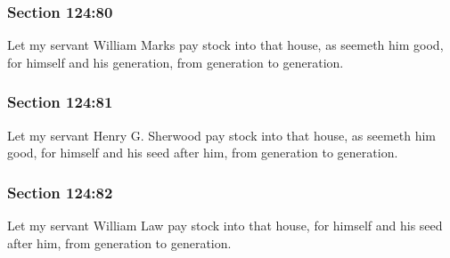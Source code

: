 	\subsubsection{Section 124:80} %
		\label{DC124-80}

		Let my servant William Marks pay stock into that house, as seemeth him good, for himself and his generation, from generation to generation.


	\subsubsection{Section 124:81} %
		\label{DC124-81}

		Let my servant Henry G. Sherwood pay stock into that house, as seemeth him good, for himself and his seed after him, from generation to generation.


	\subsubsection{Section 124:82} %
		\label{DC124-82}

		Let my servant William Law pay stock into that house, for himself and his seed after him, from generation to generation.


